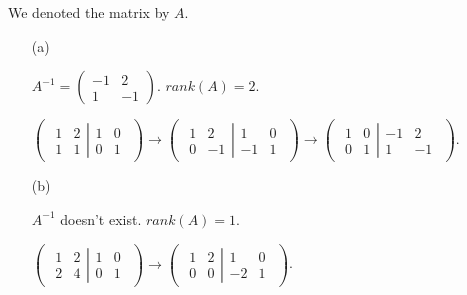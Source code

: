 \begin{Exercise}
We denoted the matrix by $A$.
\begin{enumerate}[(a)]
\item[(a)]
\begin{answer}
$A^{-1} = \begin{pmatrix}
-1 & 2 \\
1 & -1
\end{pmatrix}$. $rank(A) = 2$.
\end{answer}
\begin{solution}
$\begin{pmatrix} \left.\begin{matrix}
1 & 2 \\
1 & 1
\end{matrix} \right| \begin{matrix}
1 & 0 \\
0 & 1
\end{matrix} \end{pmatrix} \longrightarrow \begin{pmatrix} \left.\begin{matrix}
1 & 2 \\
0 & -1
\end{matrix} \right| \begin{matrix}
1 & 0 \\
-1 & 1
\end{matrix} \end{pmatrix} \longrightarrow \begin{pmatrix} \left.\begin{matrix}
1 & 0 \\
0 & 1
\end{matrix} \right| \begin{matrix}
-1 & 2 \\
1 & -1
\end{matrix} \end{pmatrix}$.
\end{solution}

\item[(b)]
\begin{answer}
$A^{-1}$ doesn't exist. $rank(A) = 1$.
\end{answer}
\begin{solution}
$\begin{pmatrix} \left.\begin{matrix}
1 & 2 \\
2 & 4
\end{matrix} \right| \begin{matrix}
1 & 0 \\
0 & 1
\end{matrix} \end{pmatrix} \longrightarrow \begin{pmatrix} \left.\begin{matrix}
1 & 2 \\
0 & 0
\end{matrix} \right| \begin{matrix}
1 & 0 \\
-2 & 1
\end{matrix} \end{pmatrix}$.
\end{solution}


\end{enumerate}
\end{Exercise}
